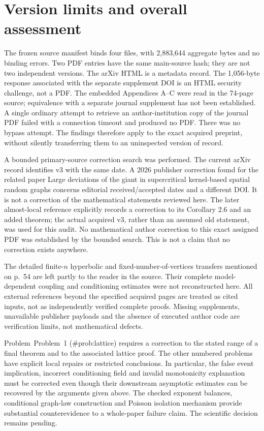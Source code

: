 \documentclass[10pt]{article}
\begin{document}
\section*{Version limits and overall assessment}
The frozen source manifest binds four files, with 2,883,644 aggregate bytes and no binding errors. Two PDF entries have the same main-source hash; they are not two independent versions. The arXiv HTML is a metadata record. The 1,056-byte response associated with the separate supplement DOI is an HTML security challenge, not a PDF. The embedded Appendices A–C were read in the 74-page source; equivalence with a separate journal supplement has not been established. A single ordinary attempt to retrieve an author-institution copy of the journal PDF failed with a connection timeout and produced no PDF. There was no bypass attempt. The findings therefore apply to the exact acquired preprint, without silently transferring them to an uninspected version of record.\par
A bounded primary-source correction search was performed. The current arXiv record identifies v3 with the same date. A 2026 publisher correction found for the related paper Large deviations of the giant in supercritical kernel-based spatial random graphs concerns editorial received/accepted dates and a different DOI. It is not a correction of the mathematical statements reviewed here. The later almost-local reference explicitly records a correction to its Corollary 2.6 and an added theorem; the actual acquired v3, rather than an assumed old statement, was used for this audit. No mathematical author correction to this exact assigned PDF was established by the bounded search. This is not a claim that no correction exists anywhere.\par
The detailed finite-\(n\) hyperbolic and fixed-number-of-vertices transfers mentioned on p. 54 are left partly to the reader in the source. Their complete model-dependent coupling and conditioning estimates were not reconstructed here. All external references beyond the specified acquired pages are treated as cited inputs, not as independently verified complete proofs. Missing supplements, unavailable publisher payloads and the absence of executed author code are verification limits, not mathematical defects.\par
Problem Problem 1 (\#prob:lattice) requires a correction to the stated range of a final theorem and to the associated lattice proof. The other numbered problems have explicit local repairs or restricted conclusions. In particular, the false event implication, incorrect conditioning field and invalid monotonicity explanation must be corrected even though their downstream asymptotic estimates can be recovered by the arguments given above. The checked exponent balances, conditional graph-law construction and Poisson isolation mechanism provide substantial counterevidence to a whole-paper failure claim. The scientific decision remains pending.\par
\end{document}
